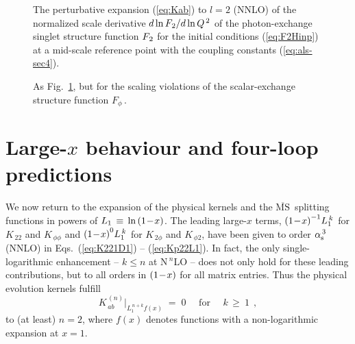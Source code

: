 \documentclass[12pt]{article}
\newcommand{\beq}{\begin{equation}}
\newcommand{\eeq}{\end{equation}}
\newcommand{\MSb}{$\overline{\mbox{MS}}$}
\newcommand{\as}{\alpha_{\rm s}}
\begin{document}
\begin{figure}[p]
\vspace*{-1mm}
\centerline{}
\vspace{-2mm}
\caption{\label{pic:fig10}
 The perturbative expansion (\ref{eq:Kab}) to $l=2$ (NNLO) of the normalized
 scale derivative $d \ln {F_{\:\! 2}} / d \ln {Q^{\, 2}}$ of the photon-exchange singlet
 structure function ${F_{\:\! 2}}$ for the initial conditions (\ref{eq:F2Hinp}) at a 
 mid-scale reference point with the coupling constants (\ref{eq:als-sec4}).
 }
\end{figure}
%
\begin{figure}[p]
\centerline{}
\vspace{-2mm}
\caption{\label{pic:fig11}
 As Fig.~\ref{pic:fig10}, but for the scaling violations of the
 scalar-exchange structure function $F_\phi\,$.
 }
\vspace{-1mm}
\end{figure}
%
%
\setcounter{equation}{0}
\section{Large-$x$ behaviour and four-loop predictions}
\label{sec:fourloop}
%
%
We now return to the expansion of the physical kernels and the \MSb\ splitting
functions in powers of $L_1 \,\equiv\, \ln \x1$. The leading large-$x$ terms,
$\x1^{-1} L_1^{\,k}$ for $K_{\,22}$ and $K_{\,\phi\phi}$ and $\x1^{0}L_1^{\,k}$
for $K_{\,2\phi}$ and $K_{\,\phi 2}$, have been given to order $\as^{\,3}$ 
(NNLO) in Eqs.\ (\ref{eq:K221D1}) -- (\ref{eq:Kp22L1}). 
In fact, the only single-logarithmic enhancement -- $k\leq n$ at N$^{\:\! n}$LO
-- does not only hold for these leading contributions, but to all orders in 
$\x1$ for all matrix entries. Thus the physical evolution kernels fulfill
%
\beq
\label{KoffdL}
  K_{\, ab}^{\,(n)} \Big|_{L_1^{\,n+k} f(x)} \; = \; 0 
  \quad \mbox{ for } \quad k \,\geq\: 1 \:\: ,
\eeq
%
to (at least) $n=2$, where $f(x)$ denotes functions with a non-logarithmic
expansion at $x=1$.
 
\end{document}
